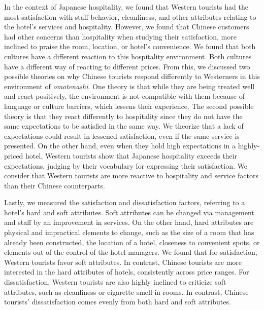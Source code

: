 \documentclass[smallextended,natbib]{svjour3}       %
\begin{document}
  In the context of Japanese hospitality, we found that Western tourists had the most satisfaction with staff behavior, cleanliness, and other attributes relating to the hotel's services and hospitality. However, we found that Chinese customers had other concerns than hospitality when studying their satisfaction, more inclined to praise the room, location, or hotel's convenience. We found that both cultures have a different reaction to this hospitality environment. Both cultures have a different way of reacting to different prices. From this, we discussed two possible theories on why Chinese tourists respond differently to Westerners in this environment of \textit{omotenashi}. One theory is that while they are being treated well and react positively, the environment is not compatible with them because of language or culture barriers, which lessens their experience. The second possible theory is that they react differently to hospitality since they do not have the same expectations to be satisfied in the same way. We theorize that a lack of expectations could result in lessened satisfaction, even if the same service is presented. On the other hand, even when they hold high expectations in a highly-priced hotel, Western tourists show that Japanese hospitality exceeds their expectations, judging by their vocabulary for expressing their satisfaction. We consider that Western tourists are more reactive to hospitality and service factors than their Chinese counterparts.

  Lastly, we measured the satisfaction and dissatisfaction factors, referring to a hotel's hard and soft attributes. Soft attributes can be changed via management and staff by an improvement in services. On the other hand, hard attributes are physical and impractical elements to change, such as the size of a room that has already been constructed, the location of a hotel, closeness to convenient spots, or elements out of the control of the hotel managers. We found that for satisfaction, Western tourists favor soft attributes. In contrast, Chinese tourists are more interested in the hard attributes of hotels, consistently across price ranges. For dissatisfaction, Western tourists are also highly inclined to criticize soft attributes, such as cleanliness or cigarette smell in rooms. In contrast, Chinese tourists' dissatisfaction comes evenly from both hard and soft attributes.
\end{document}
